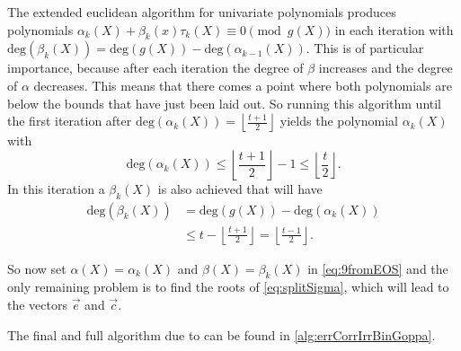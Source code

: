 The extended euclidean algorithm for univariate polynomials produces polynomials $\alpha_k\left(X\right) + \beta_k\left(x\right) \tau_k\left(X\right) \equiv 0 \pmod {g\left(X\right)}$ in each iteration with $\mathrm{deg}\left(\beta_k\left(X\right)\right) = \mathrm{deg}\left(g\left(X\right)\right) - \mathrm{deg}\left(\alpha_{k-1}\left(X\right)\right)$. This is of particular importance, because after each iteration the degree of $\beta$ increases and the degree of $\alpha$ decreases. This means that there comes a point where both polynomials are below the bounds that have just been laid out. So running this algorithm until the first iteration after $\mathrm{deg}\left(\alpha_k\left(X\right)\right) = \left\lfloor \frac{t+1}{2} \right\rfloor$ yields the polynomial $\alpha_k\left(X\right)$ with
\[
	\mathrm{deg}\left(\alpha_k\left(X\right)\right) \leq \left\lfloor \frac{t+1}{2} \right\rfloor - 1 \leq \left\lfloor \frac{t}{2} \right\rfloor.
\]
In this iteration a $\beta_k\left(X\right)$ is also achieved that will have
\begin{align*}
\mathrm{deg}\left(\beta_k\left(X\right)\right) &= \mathrm{deg}\left(g\left(X\right)\right) - \mathrm{deg}\left(\alpha_k\left(X\right)\right)\\
	&\leq t - \left\lfloor \frac{t+1}{2} \right\rfloor = \left\lfloor \frac{t-1}{2} \right\rfloor.
\end{align*}

So now set $\alpha\left(X\right) = \alpha_k\left(X\right)$ and $\beta\left(X\right) = \beta_k\left(X\right)$ in \cref{eq:9fromEOS} and the only remaining problem is to find the roots of \cref{eq:splitSigma}, which will lead to the vectors $\vec{e}$ and $\vec{c}$.

The final and full algorithm due to \cite{EOS} can be found in \cref{alg:errCorrIrrBinGoppa}.

